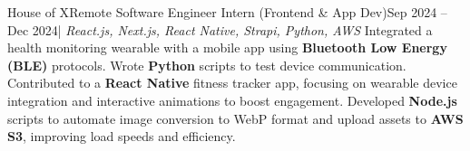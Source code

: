 \resumeSubheading
{House of X}{Remote}
{Software Engineer Intern (Frontend \& App Dev)}{Sep 2024 -- Dec 2024}{| \textit{React.js, Next.js, React Native, Strapi, Python, AWS}}
\resumeItemListStart
{}
{Integrated a health monitoring wearable with a mobile app using \textbf{Bluetooth Low Energy (BLE)} protocols. Wrote \textbf{Python} scripts to test device communication.}
{Contributed to a \textbf{React Native} fitness tracker app, focusing on wearable device integration and interactive animations to boost engagement.}
{Developed \textbf{Node.js} scripts to automate image conversion to WebP format and upload assets to \textbf{AWS S3}, improving load speeds and efficiency.}
\resumeItemListEnd